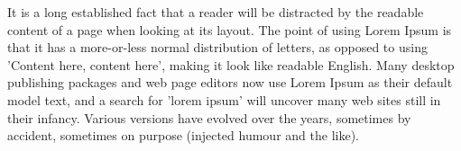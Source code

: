   It is a long established fact that a reader will be distracted by the readable content of a page when looking at its layout.
  The point of using Lorem Ipsum is that it has a more-or-less normal distribution of letters, as opposed to using 'Content here, content here', making it look like readable English.
  Many desktop publishing packages and web page editors now use Lorem Ipsum as their default model text, and a search for 'lorem ipsum' will uncover many web sites still in their infancy.
  Various versions have evolved over the years, sometimes by accident, sometimes on purpose (injected humour and the like).
